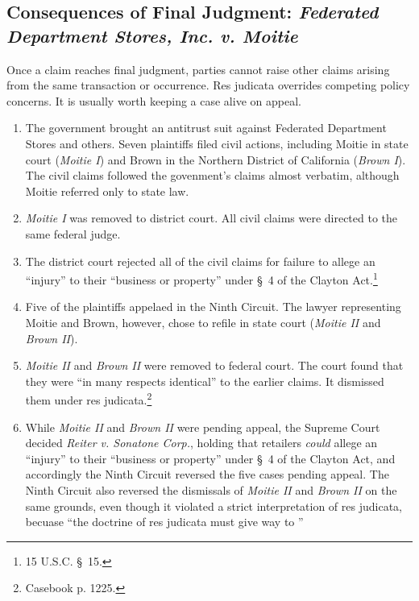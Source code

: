 \subsection{Consequences of Final Judgment: \emph{Federated Department Stores, 
Inc. v. Moitie}}

Once a claim reaches final judgment, parties cannot raise other claims arising 
from the same transaction or occurrence. Res judicata overrides competing 
policy concerns. It is usually worth keeping a case alive on appeal.

\begin{enumerate}
    \item The government brought an antitrust suit against Federated 
    Department Stores and others. Seven plaintiffs filed civil actions, 
    including Moitie in state court (\emph{Moitie I}) and Brown in the 
    Northern District of California (\emph{Brown I}). The civil claims 
    followed the govenment's claims almost verbatim, although Moitie referred 
    only to state law.
    \item \emph{Moitie I} was removed to district court. All civil claims were 
    directed to the same federal judge.
    \item The district court rejected all of the civil claims for failure to 
    allege an ``injury'' to their ``business or property'' under \S\ 4 of the 
    Clayton Act.\footnote{15 U.S.C. \S\ 15.}
    \item Five of the plaintiffs appelaed in the Ninth Circuit. The lawyer 
    representing Moitie and Brown, however, chose to refile in state court 
    (\emph{Moitie II} and \emph{Brown II}).
    \item \emph{Moitie II} and \emph{Brown II} were removed to federal court.  
    The court found that they were ``in many respects identical'' to the 
    earlier claims. It dismissed them under res judicata.\footnote{Casebook p.  
    1225.}
    \item While \emph{Moitie II} and \emph{Brown II} were pending appeal, the 
    Supreme Court decided \emph{Reiter v. Sonatone Corp.}, holding that 
    retailers \emph{could} allege an ``injury'' to their ``business or 
    property'' under \S\ 4 of the Clayton Act, and accordingly the Ninth 
    Circuit reversed the five cases pending appeal. The Ninth Circuit also 
    reversed the dismissals of \emph{Moitie II} and \emph{Brown II} on the 
    same grounds, even though it violated a strict interpretation of res 
    judicata, becuase \enquote{the doctrine of res judicata must give way to 
}
\end{enumerate}
